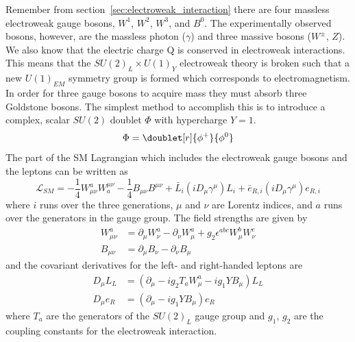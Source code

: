 Remember from section~\ref{sec:electroweak_interaction} there are four massless electroweak gauge bosons, $W^{1}$, $W^{2}$, $W^{3}$, and $B^{0}$.
The experimentally observed bosons, however, are the massless photon ($\gamma$) and three massive bosons ($W^{\pm}$, $Z$).
We also know that the electric charge Q is conserved in electroweak interactions.
This means that the $SU\left(2\right)_{L}{\times}U\left(1\right)_{Y}$ electroweak theory is broken such that a new $U\left(1\right)_{EM}$ symmetry group is formed which corresponds to electromagnetism.
In order for three gauge bosons to acquire mass they must absorb three Goldstone bosons.
The simplest method to accomplish this is to introduce a complex, scalar $SU\left(2\right)$ doublet $\Phi$ with hypercharge $Y=1$.
\begin{equation}\label{eq:higgs_scalar_field}
	\Phi=\doublet[r]{\phi^{+}}{\phi^{0}}
\end{equation}
The part of the SM Lagrangian which includes the electroweak gauge bosons and the leptons can be written as
\begin{equation}
	\mathcal{L}_{SM}=-\frac{1}{4}W_{\mu\nu}^{a}W_{a}^{\mu\nu}-\frac{1}{4}B_{\mu\nu}B^{\mu\nu}+\bar{L}_{i}\left(iD_{\mu}\gamma^{\mu}\right)L_{i}+\bar{e}_{R,i}\left(iD_{\mu}\gamma^{\mu}\right)e_{R,i}
\end{equation}
where $i$ runs over the three generations, $\mu$ and $\nu$ are Lorentz indices, and $a$ runs over the generators in the gauge group.
The field strengths are given by
\begin{align}
	W_{\mu\nu}^{a}&=\partial_{\mu}W_{\nu}^{a}-\partial_{\nu}W_{\mu}^{a}+g_{2}\epsilon^{abc}W_{\mu}^{b}W_{\nu}^{c}\\
	B_{\mu\nu}&=\partial_{\mu}B_{\nu}-\partial_{\nu}B_{\mu}
\end{align}
and the covariant derivatives for the left- and right-handed leptons are
\begin{align}
	D_{\mu}L_{L}&=\left(\partial_{\mu}-ig_{2}T_{a}W_{\mu}^{a}-ig_{1}YB_{\mu}\right)L_{L}\\
	D_{\mu}e_{R}&=\left(\partial_{\mu}-ig_{1}YB_{\mu}\right)e_{R}
\end{align}
where $T_{a}$ are the generators of the $SU\left(2\right)_{L}$ gauge group and $g_{1}$, $g_{2}$ are the coupling constants for the electroweak interaction.


